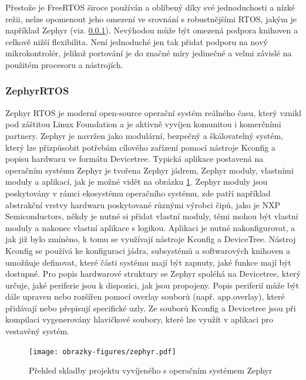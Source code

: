 Přestože je FreeRTOS široce používán a oblíbený díky své jednoduchosti a nízké režii, nelze opomenout jeho omezení ve srovnání s robustnějšími RTOS, jakým je například Zephyr (viz. \ref{zephyr_rtos}). Nevýhodou může být omezená podpora knihoven a celkově nižší flexibilita. Není jednoduché jen tak přidat podporu na nový mikrokontrolér, jelikož portování je do značné míry jedinečné a velmi závislé na použitém procesoru a nástrojích. \cite{freertos_portability, freertos_vs_zephyr}


\subsubsection{ZephyrRTOS}
\label{zephyr_rtos}
Zephyr RTOS je moderní open-source operační systém reálného času, který vznikl pod záštitou Linux Foundation a je aktivně vyvíjen komunitou i komerčními partnery. Zephyr je navržen jako modulární, bezpečný a škálovatelný systém, který lze přizpůsobit potřebám cílového zařízení pomocí nástroje Kconfig a popisu hardwaru ve formátu Devicetree. Typická aplikace postavená na operačním systému Zephyr je tvořena Zephyr jádrem, Zephyr moduly, vlastními moduly a aplikací, jak je možné vidět na obrázku \ref{fig:zephyr}. Zephyr moduly jsou poskytovány v rámci ekosystému operačního systému, zde patří například abstrakční vrstvy hardwaru poskytované různými výrobci čipů, jako je NXP Semiconductors, někdy je nutné si přidat vlastní moduly, těmi mohou být vlastní moduly a nakonec vlastní aplikace s logikou. Aplikaci je nutné nakonfigurovat, a jak již bylo zmíněno, k tomu se využívají nástroje Kconfig a DeviceTree. Nástroj Kconfig se používá ke konfiguraci jádra, subsystémů a softwarových knihoven a umožňuje  definovat, které části systému mají být zapnuty, jaké funkce mají být dostupné. Pro popis hardwarové struktury se Zephyr spoléhá na Devicetree, který určuje, jaké periferie jsou k dispozici, jak jsou propojeny. Popis periferií může být dále upraven nebo rozšířen pomocí overlay souborů (např. app.overlay), které přidávají nebo přepisují specifické uzly. Ze souborů Kconfig a Devicetree jsou při kompilaci vygenerovány hlavičkové soubory, které lze využít v aplikaci pro vestavěný systém. \cite{zephyr_doc_modules, embedded_summit_configure_zephyr}

\begin{figure}[h]
    \centering
    \texttt{[image: obrazky-figures/zephyr.pdf]}
    
    \caption{Přehled skladby projektu vyvíjeného s operačním systémem Zephyr \cite{embedded_summit_configure_zephyr}}
    \label{fig:zephyr}
\end{figure}

